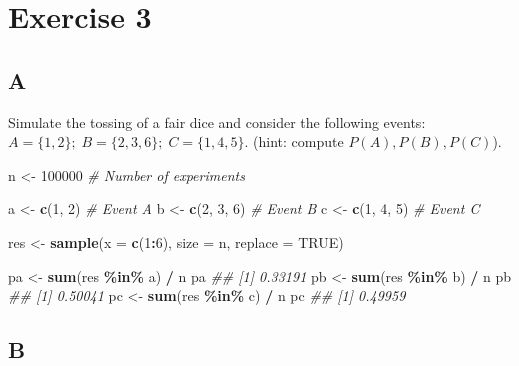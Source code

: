 \documentclass[
]{article}
\newenvironment{Shaded}{\begin{snugshade}}{\end{snugshade}}
\newcommand{\CommentTok}[1]{\textcolor[rgb]{0.56,0.35,0.01}{\textit{#1}}}
\newcommand{\DataTypeTok}[1]{\textcolor[rgb]{0.13,0.29,0.53}{#1}}
\newcommand{\DecValTok}[1]{\textcolor[rgb]{0.00,0.00,0.81}{#1}}
\newcommand{\KeywordTok}[1]{\textcolor[rgb]{0.13,0.29,0.53}{\textbf{#1}}}
\newcommand{\NormalTok}[1]{#1}
\newcommand{\OperatorTok}[1]{\textcolor[rgb]{0.81,0.36,0.00}{\textbf{#1}}}
\newcommand{\OtherTok}[1]{\textcolor[rgb]{0.56,0.35,0.01}{#1}}
\newcommand{\StringTok}[1]{\textcolor[rgb]{0.31,0.60,0.02}{#1}}
\begin{document}
\hypertarget{exercise-3}{%
\section{Exercise 3}\label{exercise-3}}

\hypertarget{a-2}{%
\subsection{A}\label{a-2}}

Simulate the tossing of a fair dice and consider the following events:
\(A=\{1,2\};\;B=\{2,3,6\};\;C=\{1,4,5\}\). (hint: compute
\(P(A),P(B),P(C)\)).

\begin{Shaded}
\begin{Highlighting}[]
\NormalTok{n \textless{}{-}}\StringTok{ }\DecValTok{100000} \CommentTok{\# Number of experiments}

\NormalTok{a \textless{}{-}}\StringTok{ }\KeywordTok{c}\NormalTok{(}\DecValTok{1}\NormalTok{, }\DecValTok{2}\NormalTok{) }\CommentTok{\# Event A}
\NormalTok{b \textless{}{-}}\StringTok{ }\KeywordTok{c}\NormalTok{(}\DecValTok{2}\NormalTok{, }\DecValTok{3}\NormalTok{, }\DecValTok{6}\NormalTok{) }\CommentTok{\# Event B}
\NormalTok{c \textless{}{-}}\StringTok{ }\KeywordTok{c}\NormalTok{(}\DecValTok{1}\NormalTok{, }\DecValTok{4}\NormalTok{, }\DecValTok{5}\NormalTok{) }\CommentTok{\# Event C}

\NormalTok{res \textless{}{-}}\StringTok{ }\KeywordTok{sample}\NormalTok{(}\DataTypeTok{x =} \KeywordTok{c}\NormalTok{(}\DecValTok{1}\OperatorTok{:}\DecValTok{6}\NormalTok{), }\DataTypeTok{size =}\NormalTok{ n, }\DataTypeTok{replace =} \OtherTok{TRUE}\NormalTok{)}

\NormalTok{pa \textless{}{-}}\StringTok{ }\KeywordTok{sum}\NormalTok{(res }\OperatorTok{\%in\%}\StringTok{ }\NormalTok{a) }\OperatorTok{/}\StringTok{ }\NormalTok{n}
\NormalTok{pa}
\CommentTok{\#\# [1] 0.33191}
\NormalTok{pb \textless{}{-}}\StringTok{ }\KeywordTok{sum}\NormalTok{(res }\OperatorTok{\%in\%}\StringTok{ }\NormalTok{b) }\OperatorTok{/}\StringTok{ }\NormalTok{n}
\NormalTok{pb}
\CommentTok{\#\# [1] 0.50041}
\NormalTok{pc \textless{}{-}}\StringTok{ }\KeywordTok{sum}\NormalTok{(res }\OperatorTok{\%in\%}\StringTok{ }\NormalTok{c) }\OperatorTok{/}\StringTok{ }\NormalTok{n}
\NormalTok{pc}
\CommentTok{\#\# [1] 0.49959}
\end{Highlighting}
\end{Shaded}

\hypertarget{b-2}{%
\subsection{B}\label{b-2}}
\end{document}
